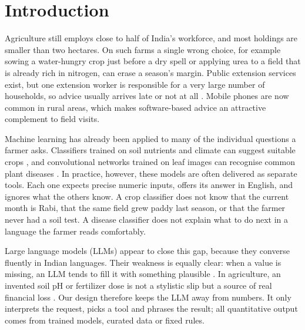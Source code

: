 \documentclass[conference]{IEEEtran}
\begin{document}
\section{Introduction}

Agriculture still employs close to half of India's workforce, and most holdings are smaller than two hectares. On such farms a single wrong choice, for example sowing a water-hungry crop just before a dry spell or applying urea to a field that is already rich in nitrogen, can erase a season's margin. Public extension services exist, but one extension worker is responsible for a very large number of households, so advice usually arrives late or not at all \cite{fabregas2019}. Mobile phones are now common in rural areas, which makes software-based advice an attractive complement to field visits.

Machine learning has already been applied to many of the individual questions a farmer asks. Classifiers trained on soil nutrients and climate can suggest suitable crops \cite{pudumalar2017,liakos2018}, and convolutional networks trained on leaf images can recognise common plant diseases \cite{mohanty2016,ferentinos2018}. In practice, however, these models are often delivered as separate tools. Each one expects precise numeric inputs, offers its answer in English, and ignores what the others know. A crop classifier does not know that the current month is Rabi, that the same field grew paddy last season, or that the farmer never had a soil test. A disease classifier does not explain what to do next in a language the farmer reads comfortably.

Large language models (LLMs) appear to close this gap, because they converse fluently in Indian languages. Their weakness is equally clear: when a value is missing, an LLM tends to fill it with something plausible \cite{ji2023}. In agriculture, an invented soil pH or fertilizer dose is not a stylistic slip but a source of real financial loss \cite{tzachor2023}. Our design therefore keeps the LLM away from numbers. It only interprets the request, picks a tool and phrases the result; all quantitative output comes from trained models, curated data or fixed rules.
\end{document}
